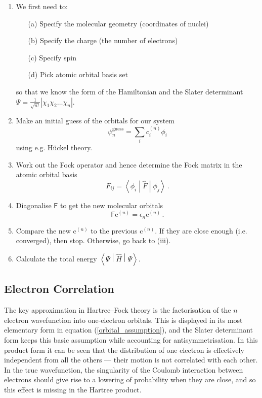 \documentclass{article}
\theoremstyle{plain}\theoremheaderfont{\normalfont\itshape}\theorembodyfont{\rmfamily}\theoremseparator{.}\newtheorem*{rem}{Remark}\newtheorem*{ex}{Example}\newtheorem*{proof}{Proof}\newtheorem*{altp}{Alternative proof}
\theoremstyle{plain}\theoremheaderfont{\normalfont\bfseries}\theorembodyfont{\rmfamily}\theoremseparator{.}\newtheorem{thm}{Theorem}[section]\newtheorem{lem}[thm]{Lemma}\newtheorem{prop}[thm]{Proposition}\newtheorem*{cor}{Corollary}\newtheorem{defn}[thm]{Definition}\newtheorem{clm}[thm]{Claim}\newtheorem{clminproof}{Claim}\newtheorem{pos}{Postulate}[section]
\theoremstyle{break}\theoremheaderfont{\normalfont\itshape}\theorembodyfont{\rmfamily}\theoremseparator{.\medskip}\newtheorem*{proofskip}{Proof}\newtheorem*{exs}{Examples}\newtheorem*{rems}{Remarks}
\theoremstyle{break}\theoremheaderfont{\normalfont\bfseries}\theorembodyfont{\rmfamily}\theoremseparator{.\medskip}\newtheorem{lemskip}[thm]{Lemma}\newtheorem{defnskip}[thm]{Definition}\newtheorem{propskip}[thm]{Proposition}\newtheorem{thmskip}[thm]{Theorem}
\numberwithin{equation}{section}
\newcommand{\expval}[2]{\left\langle #2 \middle| #1 \middle| #2 \right\rangle}
\newcommand{\mel}[3]{\left\langle #1 \middle| #2 \middle| #3 \right\rangle}
\newcommand{\vb}[1]{\bm{\mathrm{#1}}}
\newcommand{\abs}[1]{\left| #1 \right|}
\begin{document}
    \begin{enumerate}[topsep=0pt,label=(\roman*)]
        \item We first need to:
        \begin{enumerate}[topsep=0pt]
            \item[(a)] Specify the molecular geometry (coordinates of nuclei)
            \item[(b)] Specify the charge (the number of electrons)
            \item[(c)] Specify spin
            \item[(d)] Pick atomic orbital basis set 
        \end{enumerate}
        so that we know the form of the Hamiltonian and the Slater determinant \(\Psi=\frac{1}{\sqrt{n!}}\abs{\chi_1\chi_2\dots\chi_n}\).
        \item Make an initial guess of the orbitals for our system
        \begin{equation}
            \psi_n^{\text{guess}}=\sum_i c_i^{(n)}\phi_i
        \end{equation}
        using e.g. H\"{u}ckel theory.
        \item Work out the Fock operator and hence determine the Fock matrix in the atomic orbital basis
        \begin{equation}
            F_{ij}=\mel{\phi_i}{\hat{F}}{\phi_j}\,.
        \end{equation}
        \item Diagonalise \(\mathsf{F}\) to get the new molecular orbitals
        \begin{equation}
            \mathsf{F}\vb{c}^{(n)}=\epsilon_n\vb{c}^{(n)}\,.
        \end{equation}
        \item Compare the new \(\vb{c}^{(n)}\) to the previous \(\vb{c}^{(n)}\). If they are close enough (i.e. converged), then stop. Otherwise, go back to (iii).
        \item Calculate the total energy \(\expval{\hat{H}}{\Psi}\).
    \end{enumerate}

    \subsection{Electron Correlation}
    The key approximation in Hartree--Fock theory is the factorisation of the \(n\) electron wavefunction into one-electron orbitals. This is displayed in its most elementary form in equation (\ref{orbital_assumption}), and the Slater determinant form keeps this basic assumption while accounting for antisymmetrisation. In this product form it can be seen that the distribution of one electron is effectively independent from all the others --- their motion is not correlated with each other. In the true wavefunction, the singularity of the Coulomb interaction between electrons should give rise to a lowering of probability when they are close, and so this effect is missing in the Hartree product.
\end{document}
